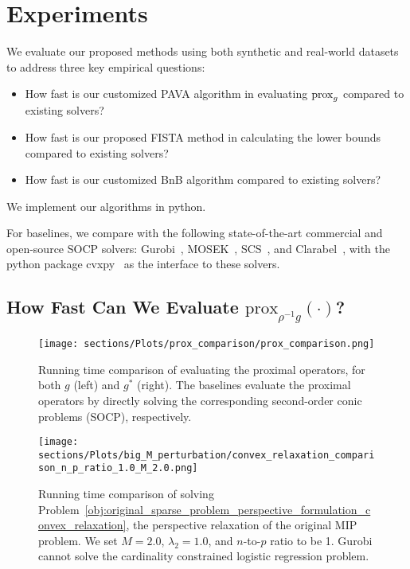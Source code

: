 \vspace{-3mm}
\section{Experiments}
\vspace{-1mm}

We evaluate our proposed methods using both synthetic and real-world datasets to address three key empirical questions: \\[-2em]
\begin{itemize}[label=$\diamond$,leftmargin=*]
    \item How fast is our customized PAVA algorithm in evaluating $\operatorname{prox}_g$ compared to existing solvers?
    \item How fast is our proposed FISTA method in calculating the lower bounds compared to existing solvers?
    \item How fast is our customized BnB algorithm compared to existing solvers?
\end{itemize}
We implement our algorithms in python.

For baselines, we compare with the following state-of-the-art commercial and open-source SOCP solvers: Gurobi~\citep{gurobi}, MOSEK~\citep{mosek}, SCS~\citep{scs}, and Clarabel~\cite{Clarabel}, with the python package cvxpy~\cite{cvxpy} as the interface to these solvers.

\vspace{-2mm}
\subsection{How Fast Can We Evaluate $\text{prox}_{\rho^{-1} g}(\cdot)$?}

\begin{figure*}[!htb]
    \centering
    \texttt{[image: sections/Plots/prox\_comparison/prox\_comparison.png]}
    \vspace{-1em}
    \caption{Running time comparison of evaluating the proximal operators, for both $g$ (left) and $g^*$ (right).
    The baselines evaluate the proximal operators by directly solving the corresponding second-order conic problems (SOCP), respectively.}
    \label{fig:prox_comparison}
    \vspace{-3mm}
\end{figure*}

\begin{figure*}[!htb]
    \centering
    \texttt{[image: sections/Plots/big\_M\_perturbation/convex\_relaxation\_comparison\_n\_p\_ratio\_1.0\_M\_2.0.png]}
    \vspace{-1em}
    \caption{Running time comparison of solving Problem~\eqref{obj:original_sparse_problem_perspective_formulation_convex_relaxation}, the perspective relaxation of the original MIP problem.
    We set $M=2.0$, $\lambda_2=1.0$, and $n$-to-$p$ ratio to be 1. Gurobi cannot solve the cardinality constrained logistic regression problem.}
    \label{fig:solve_convex_relaxation_main_paper}
    \vspace{-5mm}
\end{figure*}


